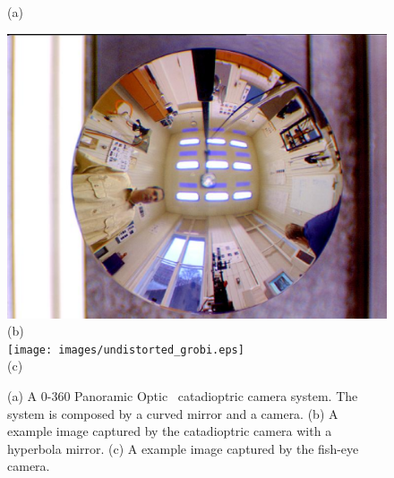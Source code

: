 \documentclass{report}
\begin{document}
\begin{savenotes}
\begin{figure}
\begin{minipage}{0.457\textwidth}
(a)
\end{minipage}
\hspace{3pt}
\begin{minipage}{0.512\textwidth}
\centering
\includegraphics[width=1\textwidth]{images/cataphoto.eps}\\
(b)\\
\texttt{[image: images/undistorted\_grobi.eps]}\\
(c)
\end{minipage}
\caption{(a) A 0-360 Panoramic Optic \texttrademark \  catadioptric camera system. \protect\footnotemark[1] The system is composed by a curved mirror and a camera. (b) A example image captured by the catadioptric camera with a hyperbola mirror. \protect\footnotemark[2] (c) A example image captured by the fish-eye camera. }
\end{figure}
\end{savenotes}
\end{document}
